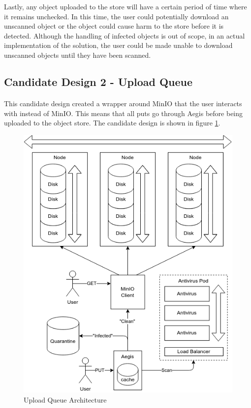 \documentclass[12pt, conference, final, a4paper, onecolumn, compsoc]{IEEEtran}
\begin{document}
Lastly, any object uploaded to the store will have a certain period of time
where it remains unchecked. In this time, the user could potentially download an
unscanned object or the object could cause harm to the store before it is
detected. Although the handling of infected objects is out of scope, in an
actual implementation of the solution, the user could be made unable to download
unscanned objects until they have been scanned.


\subsection{Candidate Design 2 - Upload Queue}
\paragraph{}

This candidate design created a wrapper around MinIO that the user interacts
with instead of MinIO. This means that all puts go through Aegis before being
uploaded to the object store. The candidate design is shown in figure
\ref{fig:uploadQueueArch}.

\begin{figure}
  \centering \includegraphics[scale=.4]{diagrams/upload-queue.png}
  \caption{Upload Queue Architecture}
  \label{fig:uploadQueueArch}
\end{figure}
\end{document}

